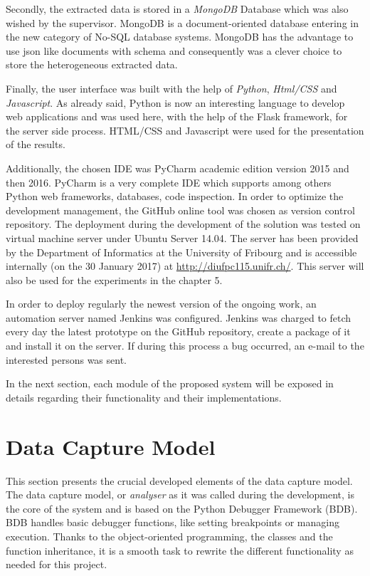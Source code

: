 Secondly, the extracted data is stored in a \textit{MongoDB} Database which was also wished by the supervisor. MongoDB is a document-oriented database entering in the new category of No-SQL database systems. MongoDB has the advantage to use \gls{json} like documents with schema and consequently was a clever choice to store the heterogeneous extracted data.

Finally, the user interface was built with the help of \textit{Python}, \textit{Html/CSS} and \textit{Javascript}. As already said, Python is now an interesting language to develop web applications and was used here, with the help of the Flask framework, for the server side process. HTML/CSS and Javascript were used for the presentation of the results.

Additionally, the chosen IDE was PyCharm academic edition version 2015 and then 2016. PyCharm is a very complete IDE which supports among others Python web frameworks, databases, code inspection. In order to optimize the development management, the GitHub online tool was chosen as version control repository. The deployment during the development of the solution was tested on virtual machine server under Ubuntu Server 14.04. The server has been provided by the Department of Informatics at the University of Fribourg and is accessible internally (on the 30 January 2017) at \url{http://diufpc115.unifr.ch/}. This server will also be used for the experiments in the chapter 5. 

In order to deploy regularly the newest version of the ongoing work, an automation server named Jenkins was configured. Jenkins was charged to fetch every day the latest prototype on the GitHub repository, create a package of it and install it on the server. If during this process a bug occurred, an e-mail to the interested persons was sent.

In the next section, each module of the proposed system will be exposed in details regarding their functionality and their implementations.

\section{Data Capture Model}
This section presents the crucial developed elements of the data capture model. The data capture model, or \textit{analyser} as it was called during the development, is the core of the system and is based on the Python Debugger Framework (BDB). BDB handles basic debugger functions, like setting breakpoints or managing execution. Thanks to the object-oriented programming, the classes and the function inheritance, it is a smooth task to rewrite the different functionality as needed for this project. 

